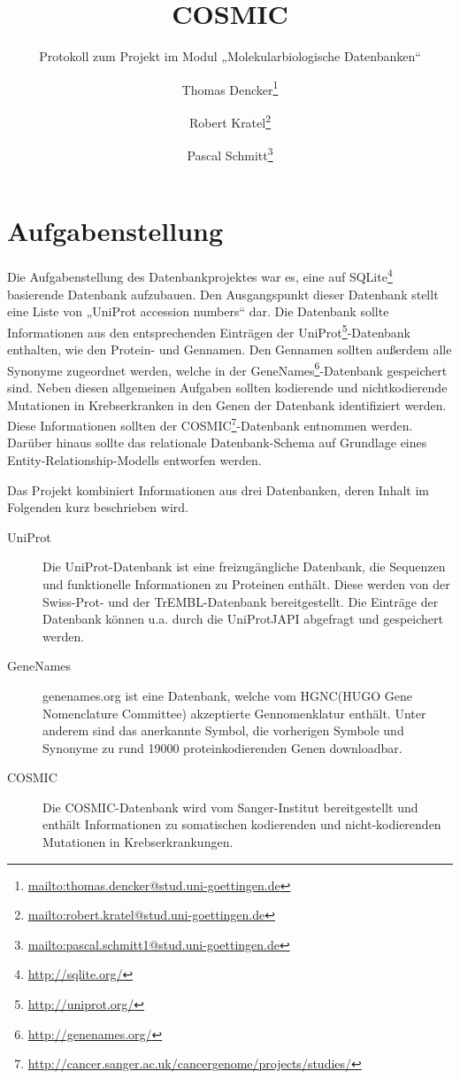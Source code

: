 \documentclass{scrartcl}
\title{COSMIC}
\subtitle{Protokoll zum Projekt im Modul „Molekularbiologische Datenbanken“}
\author{%
	Thomas Dencker\thanks{\url{mailto:thomas.dencker@stud.uni-goettingen.de}} \and
	Robert Kratel\thanks{\url{mailto:robert.kratel@stud.uni-goettingen.de}} \and
	Pascal Schmitt\thanks{\url{mailto:pascal.schmitt1@stud.uni-goettingen.de}}}
\begin{document}
\maketitle
\vfill
\tableofcontents
\newpage

\section{Aufgabenstellung}

Die Aufgabenstellung des Datenbankprojektes war es, eine auf SQLite\footnote{\url{http://sqlite.org/}} basierende Datenbank aufzubauen. Den Ausgangspunkt dieser Datenbank stellt eine Liste von „UniProt accession numbers“ dar. Die Datenbank sollte Informationen aus den entsprechenden Einträgen der UniProt\footnote{\url{http://uniprot.org/}}-Datenbank enthalten, wie den Protein- und Gennamen. Den Gennamen sollten außerdem alle Synonyme zugeordnet werden, welche in der GeneNames\footnote{\url{http://genenames.org/}}-Datenbank gespeichert sind. Neben diesen allgemeinen Aufgaben sollten kodierende und nichtkodierende Mutationen in Krebserkranken in den Genen der Datenbank identifiziert werden. Diese Informationen sollten der COSMIC\footnote{\url{http://cancer.sanger.ac.uk/cancergenome/projects/studies/}}-Datenbank entnommen werden. Darüber hinaus sollte das relationale Datenbank-Schema auf Grundlage eines Entity-Relationship-Modells entworfen werden.

Das Projekt kombiniert Informationen aus drei Datenbanken, deren Inhalt im Folgenden kurz beschrieben wird.

\begin{description}
\item[UniProt]
Die UniProt-Datenbank ist eine freizugängliche Datenbank, die Sequenzen und funktionelle Informationen zu Proteinen enthält. Diese werden von der Swiss-Prot- und der TrEMBL-Datenbank bereitgestellt. Die Einträge der Datenbank können u.a. durch die UniProtJAPI abgefragt und gespeichert werden.
\item[GeneNames]
genenames.org ist eine Datenbank, welche vom HGNC(HUGO Gene Nomenclature Committee) akzeptierte Gennomenklatur enthält. Unter anderem sind das anerkannte Symbol, die vorherigen Symbole und Synonyme zu rund 19000 proteinkodierenden Genen downloadbar.
\item[COSMIC]
Die COSMIC-Datenbank wird vom Sanger-Institut bereitgestellt und enthält Informationen zu somatischen kodierenden und nicht-kodierenden Mutationen in Krebserkrankungen.
\end{description}
\end{document}
